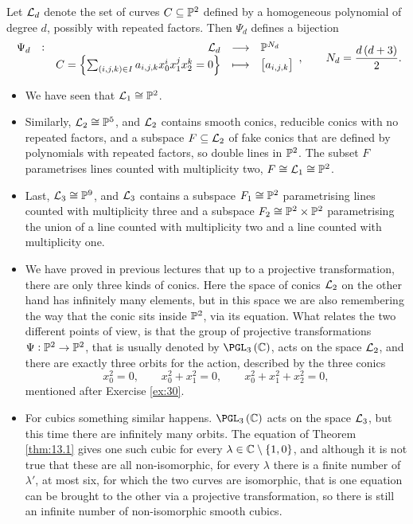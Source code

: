 \begin{definition}
Let $ \mathcal{L}_d $ denote the set of curves $ C \subseteq \mathbb{P}^2 $ defined by a homogeneous polynomial of degree $ d $, possibly with repeated factors. Then $ \Psi_d $ defines a bijection
$$ \function[\Psi_d]{\LLL_d}{\PP^{N_d}}{C = \cbr{\sum_{\br{i, j, k} \in I} a_{i, j, k}x_0^ix_1^jx_2^k = 0}}{\sbr{a_{i, j, k}}}, \qquad N_d = \dfrac{d\br{d + 3}}{2}. $$
\end{definition}

\begin{example}
\hfill
\begin{itemize}
\item We have seen that $ \mathcal{L}_1 \cong \mathbb{P}^2 $.
\item Similarly, $ \mathcal{L}_2 \cong \mathbb{P}^5 $, and $ \mathcal{L}_2 $ contains smooth conics, reducible conics with no repeated factors, and a subspace $ F \subseteq \mathcal{L}_2 $ of fake conics that are defined by polynomials with repeated factors, so double lines in $ \mathbb{P}^2 $. The subset $ F $ parametrises lines counted with multiplicity two, $ F \cong \mathcal{L}_1 \cong \mathbb{P}^2 $.
\item Last, $ \mathcal{L}_3 \cong \mathbb{P}^9 $, and $ \mathcal{L}_3 $ contains a subspace $ F_1 \cong \mathbb{P}^2 $ parametrising lines counted with multiplicity three and a subspace $ F_2 \cong \mathbb{P}^2 \times \mathbb{P}^2 $ parametrising the union of a line counted with multiplicity two and a line counted with multiplicity one.
\end{itemize}
\end{example}

\begin{remark}
\hfill
\begin{itemize}
\item We have proved in previous lectures that up to a projective transformation, there are only three kinds of conics. Here the space of conics $ \mathcal{L}_2 $ on the other hand has infinitely many elements, but in this space we are also remembering the way that the conic sits inside $ \mathbb{P}^2 $, via its equation. What relates the two different points of view, is that the group of projective transformations $ \Psi : \mathbb{P}^2 \to \mathbb{P}^2 $, that is usually denoted by $ \PGL_3\br{\CC} $, acts on the space $ \mathcal{L}_2 $, and there are exactly three orbits for the action, described by the three conics
$$ x_0^2 = 0, \qquad x_0^2 + x_1^2 = 0, \qquad x_0^2 + x_1^2 + x_2^2 = 0, $$
mentioned after Exercise \ref{ex:30}.
\item For cubics something similar happens. $ \PGL_3\br{\CC} $ acts on the space $ \mathcal{L}_3 $, but this time there are infinitely many orbits. The equation of Theorem \ref{thm:13.1} gives one such cubic for every $ \lambda \in \CC \setminus \cbr{1, 0} $, and although it is not true that these are all non-isomorphic, for every $ \lambda $ there is a finite number of $ \lambda' $, at most six, for which the two curves are isomorphic, that is one equation can be brought to the other via a projective transformation, so there is still an infinite number of non-isomorphic smooth cubics.
\end{itemize}
\end{remark}

